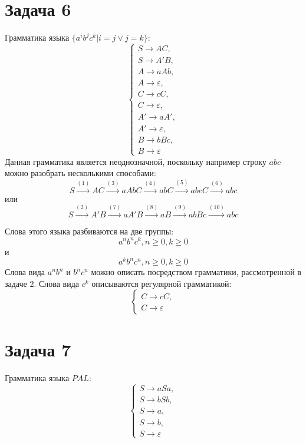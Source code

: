 \documentclass[11pt]{article}
\begin{document}
\section{Задача 6}
\label{sec:orgde4a7fb}
Грамматика языка \(\{a^ib^jc^k | i = j \vee j = k\}\):
\begin{equation}
\begin{cases}
S \rightarrow AC, \\
S \rightarrow A'B, \\
A \rightarrow aAb, \\
A \rightarrow \varepsilon, \\
C \rightarrow cC, \\
C \rightarrow \varepsilon, \\
A' \rightarrow aA', \\
A' \rightarrow \varepsilon, \\
B \rightarrow bBc, \\
B \rightarrow \varepsilon
\end{cases}
\end{equation}
Данная грамматика является неоднозначной, поскольку например строку $abc$ можно разобрать
несколькими способами:
\begin{equation}
S \stackrel{(1)}{\rightarrow} AC \stackrel{(3)}{\rightarrow} aAbC \stackrel{(4)}{\rightarrow}
abC \stackrel{(5)}{\rightarrow} abcC \stackrel{(6)}{\rightarrow} abc
\end{equation}
или
\begin{equation}
S \stackrel{(2)}{\rightarrow} A'B \stackrel{(7)}{\rightarrow} aA'B \stackrel{(8)}{\rightarrow}
aB \stackrel{(9)}{\rightarrow} abBc \stackrel{(10)}{\rightarrow} abc
\end{equation}

Слова этого языка разбиваются на две группы:
\begin{equation}
a^nb^nc^k, n \geq 0, k \geq 0
\end{equation}
и
\begin{equation}
a^kb^nc^n, n \geq 0, k \geq 0
\end{equation}
Слова вида $a^nb^n$ и $b^nc^n$ можно описать посредством грамматики, рассмотренной в задаче 2.
Слова вида $c^k$ описываются регулярной грамматикой:
\begin{equation}
\begin{cases}
C \rightarrow cC, \\
C \rightarrow \varepsilon
\end{cases}
\end{equation}
\section{Задача 7}
\label{sec:orgea6cfd8}
Грамматика языка \(PAL\):
\begin{equation}
\begin{cases}
S \rightarrow aSa, \\
S \rightarrow bSb, \\
S \rightarrow a, \\
S \rightarrow b, \\
S \rightarrow \varepsilon
\end{cases}
\end{equation}
\end{document}
